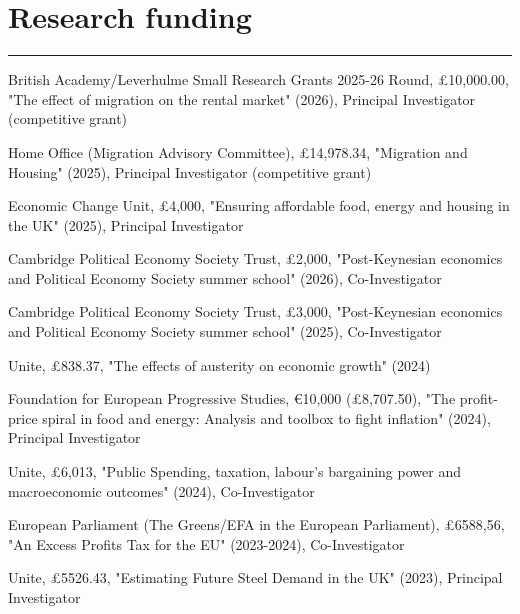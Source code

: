 \documentclass[letterpaper]{article}
\renewenvironment{itemize}{
  \begin{list}{}
    { \setlength{\itemsep}{5pt}
      \setlength{\parsep}{0pt}
      \setlength{\topsep}{0pt}
      \setlength{\leftmargin}{0em} } }{
  \end{list}}
\begin{document}
\section*{Research funding}
\hrule
\vspace{2mm}
\begin{itemize}
    \item British Academy/Leverhulme Small Research Grants 2025-26 Round, £10,000.00, "The effect of migration on the rental market" (2026), Principal Investigator (competitive grant)
    \item Home Office (Migration Advisory Committee), £14,978.34, "Migration and Housing" (2025), Principal Investigator (competitive grant)
    \item Economic Change Unit, £4,000, "Ensuring affordable food, energy and housing in the UK" (2025), Principal Investigator
    \item Cambridge Political Economy Society Trust, £2,000, "Post-Keynesian economics and Political Economy Society summer school" (2026), Co-Investigator
    \item Cambridge Political Economy Society Trust, £3,000, "Post-Keynesian economics and Political Economy Society summer school" (2025), Co-Investigator
    \item Unite, £838.37, "The effects of austerity on economic growth" (2024)
    \item Foundation for European Progressive Studies, €10,000 (£8,707.50), "The profit-price spiral in food and energy: Analysis and toolbox to fight inflation" (2024), Principal Investigator
    \item Unite, £6,013, "Public Spending, taxation, labour's bargaining power and macroeconomic outcomes" (2024), Co-Investigator
    \item European Parliament (The Greens/EFA in the European Parliament), £6588,56, "An Excess Profits Tax for the EU" (2023-2024), Co-Investigator
    \item Unite, £5526.43, "Estimating Future Steel Demand in the UK" (2023), Principal Investigator
\end{itemize}
\end{document}
